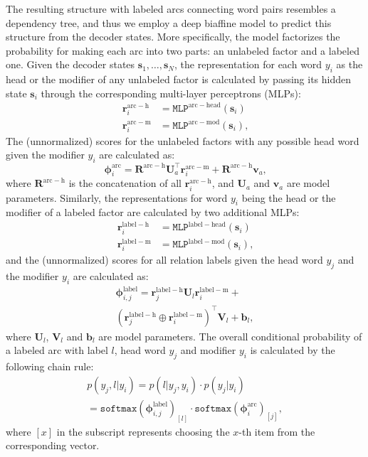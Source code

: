 \documentclass[11pt,a4paper]{article}
\begin{document}
The resulting structure with labeled arcs connecting word pairs resembles a dependency tree, and thus we employ a deep biaffine model \citep{dozat2016deep} to predict this structure from the decoder states.
More specifically, the model factorizes the probability for making each arc into two parts: an unlabeled factor and a labeled one.
Given the decoder states $\boldsymbol{s}_1,\dots,\boldsymbol{s}_N$, the representation for each word $y_i$ as the head or the modifier of any unlabeled factor is calculated by passing its hidden state $\boldsymbol{s}_i$ through the corresponding multi-layer perceptrons (MLPs):
\begin{align} \label{eq:arc-h}
    \boldsymbol{r}_i^{\mathrm{arc-h}} &= \mathtt{MLP}^{\mathrm{arc-head}}(\boldsymbol{s}_i) \\ \label{eq:arc-m}
    \boldsymbol{r}_i^{\mathrm{arc-m}} &= \mathtt{MLP}^{\mathrm{arc-mod}}(\boldsymbol{s}_i) \text{,}
\end{align}
The (unnormalized) scores for the unlabeled factors with any possible head
word given the modifier $y_i$ are calculated as:
\begin{equation}
        \boldsymbol{\phi}_i^{\mathrm{arc}} = \boldsymbol{R}^{\mathrm{arc-h}}\boldsymbol{U}_a^\intercal \boldsymbol{r}_i^{\mathrm{arc-m}} + \boldsymbol{R}^{\mathrm{arc-h}}\boldsymbol{v}_a \text{,}
\end{equation}
where $\boldsymbol{R}^{\mathrm{arc-h}}$ is the concatenation of all $\boldsymbol{r}_i^{\mathrm{arc-h}}$, and $\boldsymbol{U}_a$ and $\boldsymbol{v}_a$ are model parameters.
Similarly, the representations for word $y_i$ being the head or the modifier of a labeled factor are calculated by two additional MLPs:
\begin{align} \label{eq:label-h}
    \boldsymbol{r}_i^{\mathrm{label-h}} &= \mathtt{MLP}^{\mathrm{label-head}}(\boldsymbol{s}_i) \\ \label{eq:label-m}
    \boldsymbol{r}_i^{\mathrm{label-m}} &= \mathtt{MLP}^{\mathrm{label-mod}}(\boldsymbol{s}_i) \text{,}
\end{align}
and the (unnormalized) scores for all relation labels given the head word $y_j$
and the modifier $y_i$ are calculated as:
\begin{multline}
    \boldsymbol{\phi}_{i,j}^{\mathrm{label}} = \boldsymbol{r}_j^{\mathrm{label-h}} \boldsymbol{U}_l \boldsymbol{r}_i^{\mathrm{label-m}} + \\ (\boldsymbol{r}_j^{\mathrm{label-h}} \oplus \boldsymbol{r}_i^{\mathrm{label-m}})^\intercal \boldsymbol{V}_l + \boldsymbol{b}_l,
\end{multline}
where $\boldsymbol{U}_l$, $\boldsymbol{V}_l$ and $\boldsymbol{b}_l$ are model parameters.
The overall conditional probability of a labeled arc with label $l$, head word $y_j$ and modifier $y_i$ is calculated by the following chain rule:
\begin{multline}
    p(y_j,l|y_i) = p(l|y_j,y_i) \cdot p(y_j|y_i) \\
    = \mathtt{softmax}(\boldsymbol{\phi}_{i,j}^{\mathrm{label}})_{[l]} \cdot \mathtt{softmax}(\boldsymbol{\phi}_i^{\mathrm{arc}})_{[j]},
\end{multline}
where $[x]$ in the subscript represents choosing the $x$-th item from the corresponding vector.
\end{document}
